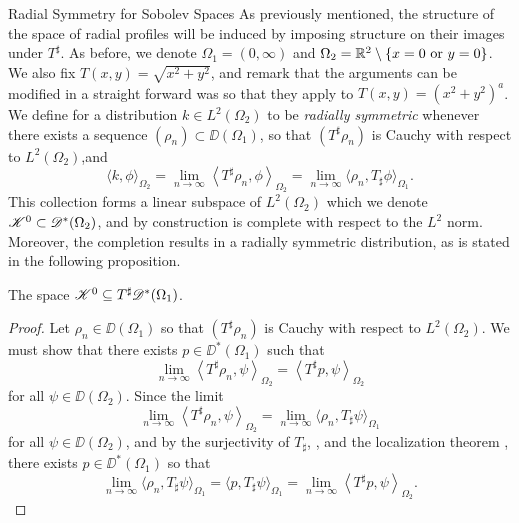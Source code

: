 \begin{chapter}{Radial Symmetry for Sobolev Spaces}
As previously mentioned, the structure of the space of radial profiles will be induced by imposing structure on their images under $T^\sharp$.
As before, we denote $\Omega_1 = (0,\infty)$ and $\Omega_2 = \mathbb R^2\setminus\{x=0\text{ or }y=0\}$.  
We also fix $T(x,y) = \sqrt{x^2+y^2}$, and remark that the arguments can be modified in a straight forward was so that they apply to $T(x,y) = (x^2 + y^2)^a$. 
We define for a distribution $k\in L^2(\Omega_2)$ to be \emph{radially symmetric} whenever there exists a sequence $(\rho_n) \subset \DD(\Omega_1)$, so that $(T^\sharp \rho_n)$ is Cauchy with respect to $L^2(\Omega_2)$,and
\begin{equation} \label{eq:cauchySequenceCorrespondence}
  \Big\langle k,\phi\Big\rangle_{\Omega_2} = \lim_{n\to\infty}\left\langle T^\sharp \rho_n, \phi\right\rangle_{\Omega_2} = \lim_{n\to\infty}\Big\langle \rho_n, T_\sharp \phi\Big\rangle_{\Omega_1}.
\end{equation}
This collection forms a linear subspace of $L^2(\Omega_2)$ which we denote $\mathscr K^0 \subset \mathscr D^*(\Omega_2)$, and by construction is complete with respect to the $L^2$ norm.
Moreover, the completion results in a radially symmetric distribution, as is stated in the following proposition.
\begin{prop}
  The space $\mathscr K^0 \subseteq T^\sharp \mathscr D^*(\Omega_1)$.
\end{prop}
\begin{proof}
  Let $\rho_n \in \DD(\Omega_1)$ so that $(T^\sharp \rho_n)$ is Cauchy with respect to $L^2(\Omega_2)$.
  We must show that there exists $p \in \DD^*(\Omega_1)$ such that
  \begin{equation}
    \lim_{n\to\infty} \left\langle T^\sharp \rho_n,\psi\right\rangle_{\Omega_2} = \left\langle T^\sharp p,\psi \right\rangle_{\Omega_2}
  \end{equation}
  for all $\psi \in \DD(\Omega_2)$.
  Since the limit
  \begin{equation}
    \lim_{n\to\infty} \left\langle T^\sharp \rho_n, \psi \right\rangle_{\Omega_2}
    = \lim_{n\to\infty} \Big\langle \rho_n, T_\sharp \psi \Big\rangle_{\Omega_1}
  \end{equation}
  for all $\psi\in \DD(\Omega_2)$, and by the surjectivity of $T_\sharp$, , and the localization theorem , there exists $p \in \DD^*(\Omega_1)$ so that
  \begin{equation}
     \lim_{n\to\infty} \Big\langle \rho_n, T_\sharp \psi \Big\rangle_{\Omega_1} = \Big\langle p,T_\sharp \psi \Big\rangle_{\Omega_1} = \lim_{n\to\infty} \left\langle T^\sharp p, \psi \right\rangle_{\Omega_2}.
  \end{equation}
\end{proof}


\end{chapter}
